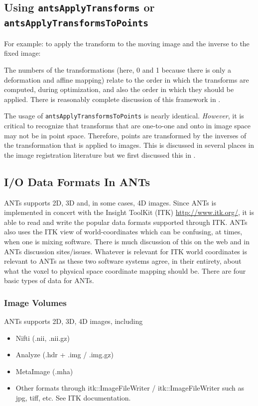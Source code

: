 \documentclass{InsightArticle}
\begin{document}
\subsection{Using \texttt{antsApplyTransforms} or \texttt{antsApplyTransformsToPoints}}
For example: to apply the transform to the moving image and the
inverse to the fixed image:

The numbers of the transformations (here, 0 and 1 because there is
only a deformation and affine mapping) relate to the order in which
the transforms are computed, during optimization, and also the order
in which they should be applied.  There is reasonably complete
discussion of this framework in \cite{AvantsITK}.

The usage of \texttt{antsApplyTransformsToPoints} is nearly identical.
\textit{However}, it is critical to recognize that transforms that are
one-to-one and onto in image space may not be in point space.
Therefore, points are transformed by the inverses of the
transformation that is applied to images.   This is discussed in
several places in the image registration literature but we first
discussed this in \cite{Avants2006d}.


\subsection{I/O Data Formats In ANTs}
ANTs supports 2D, 3D and, in some cases, 4D images. 
Since ANTs is implemented in concert with the Insight ToolKit (ITK) \href{http://www.itk.org/}{http://www.itk.org/}, 
it is able to read and write the popular data formats supported
through ITK.  ANTs also uses the ITK view of world-coordinates which
can be confusing, at times, when one is mixing software.  There is
much discussion of this on the web and in ANTs discussion
sites/issues.  Whatever is relevant for ITK
world coordinates is relevant to ANTs as these two software systems
agree, in their entirety, about what the voxel to physical space
coordinate mapping should be. 
There are four basic types of data for ANTs.
\subsubsection{Image Volumes}
ANTs supports 2D, 3D, 4D images, including
\begin{itemize}
\item Nifti (.nii, .nii.gz)
\item Analyze (.hdr + .img / .img.gz)
\item MetaImage (.mha)
\item Other formats through itk::ImageFileWriter / itk::ImageFileWriter such as jpg, tiff, etc.  See ITK documentation. 
\end{itemize}
\end{document}

